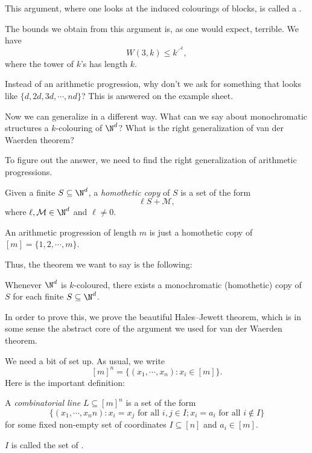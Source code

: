 \documentclass[a4paper]{article}
\begin{document}
This argument, where one looks at the induced colourings of blocks, is called a .

The bounds we obtain from this argument is, as one would expect, terrible. We have
\[
  W(3, k) \leq k^{\iddots^k}, %
\]
where the tower of $k$'s has length $k$.

Instead of an arithmetic progression, why don't we ask for something that looks like $\{d, 2d, 3d, \cdots, nd\}$? This is answered on the example sheet.

Now we can generalize in a different way. What can we say about monochromatic structures a $k$-colouring of $\N^d$? What is the right generalization of van der Waerden theorem?

To figure out the answer, we need to find the right generalization of arithmetic progressions.

\begin{defi}
  Given a finite $S \subseteq \N^d$, a \emph{homothetic copy} of $S$ is a set of the form
  \[
    \ell S + \mathcal{M},
  \]
  where $\ell, \mathcal{M} \in \N^d$ and $\ell \not= 0$.
\end{defi}

\begin{eg}
  An arithmetic progression of length $m$ is just a homothetic copy of $[m] = \{1, 2, \cdots, m\}$.
\end{eg}

Thus, the theorem we want to say is the following:
\begin{thm}[Gallai]
  Whenever $\N^d$ is $k$-coloured, there exists a monochromatic (homothetic) copy of $S$ for each finite $S \subseteq \N^d$.
\end{thm}

In order to prove this, we prove the beautiful Hales--Jewett theorem, which is in some sense the abstract core of the argument we used for van der Waerden theorem.

We need a bit of set up. As usual, we write
\[
  [m]^n = \{(x_1, \cdots, x_n): x_i \in [m]\}.
\]
Here is the important definition:
\begin{defi}
  A \emph{combinatorial line} $L \subseteq [m]^n$ is a set of the form
  \[
    \{(x_1, \cdots, x_nn): x_i = x_j\text{ for all }i, j \in I; x_i = a_i\text{ for all }i \not\in I\}
  \]
  for some fixed non-empty set of coordinates $I \subseteq [n]$ and $a_i \in [m]$.

  $I$ is called the set of .
\end{defi}
\end{document}
